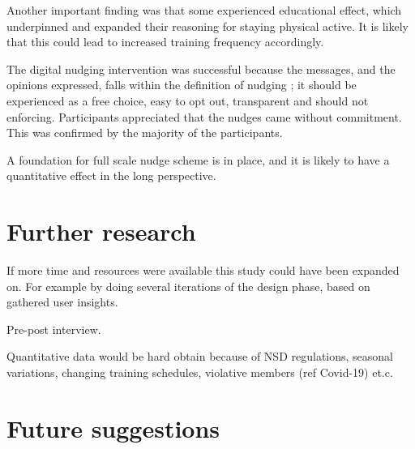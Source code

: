 Another important finding was that some experienced educational effect, which underpinned and expanded their reasoning for staying physical active. It is likely that this could lead to increased training frequency accordingly. 


The digital nudging intervention was successful because the messages, and the opinions expressed, falls within the definition of nudging ; it should be experienced as a free choice, easy to opt out, transparent and should not enforcing. Participants appreciated that the nudges came without commitment. This was confirmed by the majority of the participants. 

A foundation for full scale nudge scheme is in place, and it is likely to have a quantitative effect in the long perspective. 



\section{Further research}

If more time and resources were available this study could have been expanded on. 
For example by doing several iterations of the design phase, based on gathered user insights.  

Pre-post interview. 


Quantitative data would be hard obtain because of NSD regulations, seasonal variations, changing training schedules, violative members (ref Covid-19) et.c.

\section{Future suggestions}













